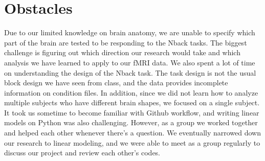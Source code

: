 \section{Obstacles}

Due to our limited knowledge on brain anatomy, we are unable to specify which
part of the brain are tested to be responding to the Nback tasks. The
biggest challenge is figuring out which direction our research would take and
which analysis we have learned to apply to our fMRI data. We also spent a lot of
time on understanding the design of the Nback task. The task design is not the
usual block design we have seen from class, and the data provides incomplete
information on condition files. In addition, since we did not learn how
to analyze multiple subjects who have different brain shapes, we focused on a
single subject. It took us sometime to become familiar with Github workflow, and
writing linear models on Python was also challenging. However, as a group we
worked together and helped each other whenever there's a question. We eventually
narrowed down our research to linear modeling, and we were able to meet as a
group regularly to discuss our project and review each other's codes. 
